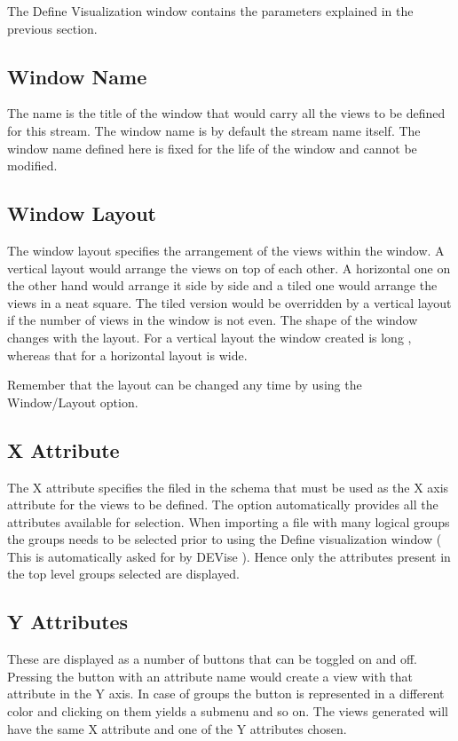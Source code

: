 The Define Visualization window contains the parameters explained in the previous section.

\subsection{Window Name}

The name is the title of the window that would carry all the views to be defined for this stream. The window name is by default the stream name itself. The window name defined here is fixed for the life of the window and cannot be modified.

\subsection{Window Layout}

The window layout specifies the arrangement of the views within the window. A vertical layout would arrange the views on top of each other. A horizontal one on the other hand would arrange it side by side and a tiled one would arrange the views in a neat square. The tiled version would be overridden by a vertical layout if the number of views in the window is not even. The shape of the window changes with the layout. For a vertical layout the window created is long , whereas that for a horizontal layout is wide.

Remember that the layout can be changed any time by using the Window/Layout option.

\subsection{X Attribute}

The X attribute specifies the filed in the schema that must be used as the X axis attribute for the views to be defined. The option automatically provides all the attributes available for selection. When importing a file with many logical groups the groups needs to be selected prior to using the Define visualization window ( This is automatically asked for by DEVise ). Hence only the attributes present  in the top level groups selected are displayed.

\subsection{Y Attributes}

These are displayed as a number of buttons that can be toggled on and  off. Pressing the button with an attribute name would create a view with that attribute in the Y axis. In case of groups the button is represented in a different color and clicking on them yields a submenu and so on. The views generated will have the same  X attribute and one of the Y attributes chosen.

